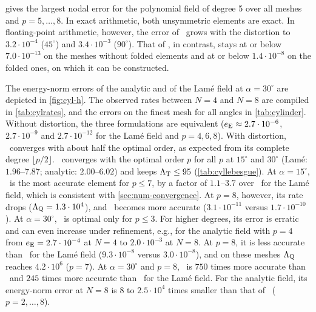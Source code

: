  gives the largest nodal error for the polynomial field of degree 5 over all meshes and $p=5,\dots,8$. In exact arithmetic, both unsymmetric elements are exact. In floating-point arithmetic, however, the error of \PM\ grows with the distortion to $3.2\cdot10^{-4}$ ($45^\circ$) and $3.4\cdot10^{-3}$ ($90^\circ$). That of \PH, in contrast, stays at or below $7.0\cdot10^{-13}$ on the meshes without folded elements and at or below $1.4\cdot10^{-8}$ on the folded ones, on which it can be constructed.

\begin{table}[htbp]
  \centering\small
  \caption{Thick cylinder, polynomial field of degree 5: largest relative nodal error over $N=1,\dots,8$ and $p=5,\dots,8$; in parentheses the number of rejected cases.}
  \label{tab:cylpoly}
  
\end{table}

The energy-norm errors of the analytic and of the Lam\'e field at $\alpha=30^\circ$ are depicted in \cref{fig:cyl-h}. The observed rates between $N=4$ and $N=8$ are compiled in \cref{tab:cylrates}, and the errors on the finest mesh for all angles in \cref{tab:cylinder}. Without distortion, the three formulations are equivalent ($e_{\mathrm{E}}\approx2.7\cdot10^{-6}$, $2.7\cdot10^{-9}$ and $2.7\cdot10^{-12}$ for the Lam\'e field and $p=4,6,8$). With distortion, \PP\ converges with about half the optimal order, as expected from its complete degree $\lfloor p/2\rfloor$. \PH\ converges with the optimal order $p$ for all $p$ at $15^\circ$ and $30^\circ$ (Lam\'e: $1.96$--$7.87$; analytic: $2.00$--$6.02$) and keeps $\Lambda_{\mathrm{T}}\le95$ (\cref{tab:cyllebesgue}). At $\alpha=15^\circ$, \PM\ is the most accurate element for $p\le7$, by a factor of $1.1$--$3.7$ over \PH\ for the Lam\'e field, which is consistent with \cref{sec:num-convergence}. At $p=8$, however, its rate drops ($\Lambda_{\mathrm{Q}}=1.3\cdot10^{4}$), and \PH\ becomes more accurate ($3.1\cdot10^{-11}$ versus $1.7\cdot10^{-10}$). At $\alpha=30^\circ$, \PM\ is optimal only for $p\le3$. For higher degrees, its error is erratic and can even increase under refinement, e.g., for the analytic field with $p=4$ from $e_{\mathrm{E}}=2.7\cdot10^{-4}$ at $N=4$ to $2.0\cdot10^{-3}$ at $N=8$. At $p=8$, it is less accurate than \PP\ for the Lam\'e field ($9.3\cdot10^{-8}$ versus $3.0\cdot10^{-8}$), and on these meshes $\Lambda_{\mathrm{Q}}$ reaches $4.2\cdot10^{6}$ ($p=7$). At $\alpha=30^\circ$ and $p=8$, \PH\ is $750$ times more accurate than \PM\ and $245$ times more accurate than \PP\ for the Lam\'e field. For the analytic field, its energy-norm error at $N=8$ is $8$ to $2.5\cdot10^4$ times smaller than that of \PP\ ($p=2,\dots,8$).


